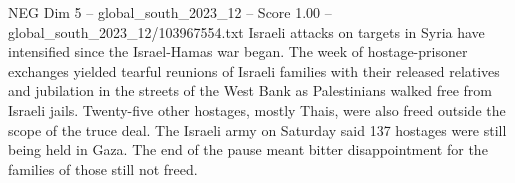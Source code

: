 \begin{textsample}{NEG Dim 5 – global\_south\_2023\_12 – Score 1.00 – global\_south\_2023\_12/103967554.txt}
Israeli attacks on targets in Syria have intensified since the Israel-Hamas war began.
The week of hostage-prisoner exchanges yielded tearful reunions of Israeli families with their released relatives and jubilation in the streets of the West Bank as Palestinians walked free from Israeli jails.
Twenty-five other hostages, mostly Thais, were also freed outside the scope of the truce deal.
The Israeli army on Saturday said 137 hostages were still being held in Gaza.
The end of the pause meant bitter disappointment for the families of those still not freed.

\end{textsample}
